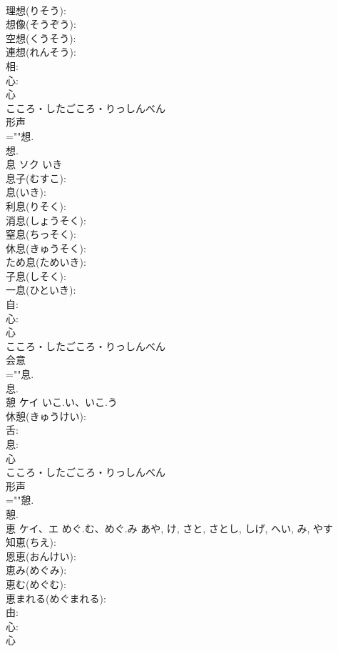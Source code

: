\documentclass[8pt]{extreport}
\begin{document}
\begin{CJK}{UTF8}{min}
\\	理想(りそう): 
\\	想像(そうぞう): 
\\	空想(くうそう): 
\\	連想(れんそう): 
\\	相: 
\\	心: 
\\	心	
\\	こころ・したごころ・りっしんべん	
\\	形声 
\\	=""想.
\\	想.
\\	息	ソク	いき		
\\	息子(むすこ): 
\\	息(いき): 
\\	利息(りそく): 
\\	消息(しょうそく): 
\\	窒息(ちっそく): 
\\	休息(きゅうそく): 
\\	ため息(ためいき): 
\\	子息(しそく): 
\\	一息(ひといき): 
\\	自: 
\\	心: 
\\	心	
\\	こころ・したごころ・りっしんべん	
\\	会意 
\\	=""息.
\\	息.
\\	憩	ケイ	いこ.い、いこ.う		
\\	休憩(きゅうけい): 
\\	舌: 
\\	息: 
\\	心	
\\	こころ・したごころ・りっしんべん	
\\	形声 
\\	=""憩.
\\	憩.
\\	恵	ケイ、エ	めぐ.む、めぐ.み	あや, け, さと, さとし, しげ, へい, み, やす	
\\	知恵(ちえ): 
\\	恩恵(おんけい): 
\\	恵み(めぐみ): 
\\	恵む(めぐむ): 
\\	恵まれる(めぐまれる): 
\\	由: 
\\	心: 
\\	心	

\end{CJK}
\end{document}
